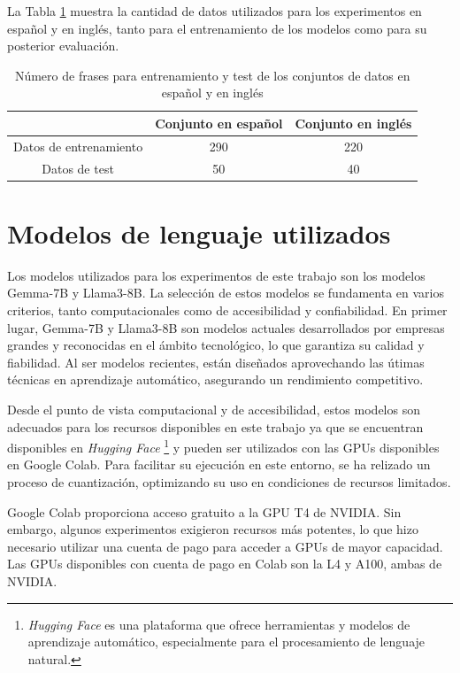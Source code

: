 \documentclass[11pt,spanish,listoffigures,listoftables]{tfgetsinf}
\begin{document}
La Tabla \ref{tab:frases} muestra la cantidad de datos utilizados para los experimentos en español y en inglés, tanto para el entrenamiento de los modelos como para su posterior evaluación.

\begin{table}[!h]
\caption{Número de frases para entrenamiento y test de los conjuntos de datos en español y en inglés}
\begin{center}
\begin{tabular}{  c || c  c  }
	\ & Conjunto en español & Conjunto en inglés \\
	\hline
	Datos de entrenamiento & 290 & 220 \\
	Datos de test & 50 & 40
\end{tabular}
\end{center}
\label{tab:frases}
\end{table}

\section{Modelos de lenguaje utilizados}

Los modelos utilizados para los experimentos de este trabajo son los modelos Gemma-7B y Llama3-8B. La selección de estos modelos se fundamenta en varios criterios, tanto computacionales como de accesibilidad y confiabilidad. En primer lugar, Gemma-7B y Llama3-8B son modelos actuales desarrollados por empresas grandes y reconocidas en el ámbito tecnológico, lo que garantiza su calidad y fiabilidad. Al ser modelos recientes, están diseñados aprovechando las útimas técnicas en aprendizaje automático, asegurando un rendimiento competitivo.

Desde el punto de vista computacional y de accesibilidad, estos modelos son adecuados para los recursos disponibles en este trabajo ya que se encuentran disponibles en \textit{Hugging Face} \footnote{\textit{Hugging Face} es una plataforma que ofrece herramientas y modelos de aprendizaje automático, especialmente para el procesamiento de lenguaje natural.} y pueden ser utilizados con las GPUs disponibles en Google Colab. Para facilitar su ejecución en este entorno, se ha relizado un proceso de cuantización, optimizando su uso en condiciones de recursos limitados.

Google Colab proporciona acceso gratuito a la GPU T4 de NVIDIA. Sin embargo, algunos experimentos exigieron recursos más potentes, lo que hizo necesario utilizar una cuenta de pago para acceder a GPUs de mayor capacidad. Las GPUs disponibles con cuenta de pago en Colab son la L4 y A100, ambas de NVIDIA.
\end{document}
